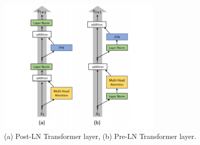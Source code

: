 \begin{figure}
	\centering
	\includegraphics[width=0.7\textwidth]{figures/ml_theory/post_pre_trsf.png}
	\caption{(a) Post-LN Transformer layer, (b) Pre-LN Transformer
		layer.}
	\label{fig:post_pre_trsf}
\end{figure}


